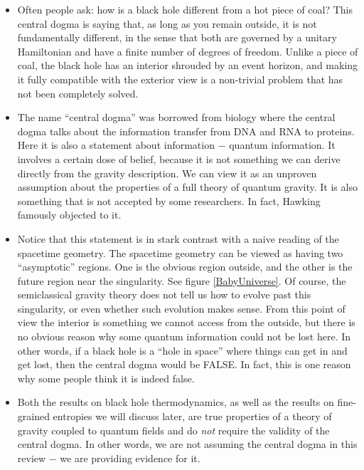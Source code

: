 \begin{itemize}
\item
Often people ask: how is a black hole different from a hot piece of coal? This central dogma is saying that, as long as you remain outside, it is not fundamentally different, in the sense that both are governed by a unitary Hamiltonian and have a finite number of degrees of freedom. Unlike a piece of coal, the black hole has an interior shrouded by an event horizon, and making it fully compatible with the exterior view is a non-trivial problem that has not been completely solved. 
\item
The name ``central dogma'' was borrowed from biology where the central dogma talks about the information transfer from DNA and RNA to proteins. Here it is also a statement about information  $-$ quantum information. It involves a certain dose of belief, because it is not something we can derive directly from the gravity description.  We can view it as an unproven assumption about the properties of a full theory of quantum gravity. It is also something that is not accepted by some researchers. In fact,  Hawking famously objected to it. 
\item
Notice that this statement is in stark contrast with a naive reading of the spacetime geometry. The spacetime geometry can be viewed as having two ``asymptotic'' regions. One is the obvious region outside, and the other is the future region near the singularity. See figure \ref{BabyUniverse}. Of course, the semiclassical gravity theory does not tell us how to evolve past this singularity, or even whether such evolution makes sense. From this point of view the interior is something we cannot access from the outside, but there is no obvious reason why some quantum information could not be lost here. In other words, if a black hole is a ``hole in space'' where things can get in and get lost, then the central dogma would be FALSE. In fact, this is one reason why some people think it is indeed false.  
\item
Both the results on black hole thermodynamics, as well as the results on fine-grained entropies we will discuss later, are true properties of a theory of gravity coupled to quantum fields and do {\it not} require the validity of the central dogma.   In other words, we are not assuming the central dogma in this review $-$ we are providing evidence for it. 
\end{itemize}

